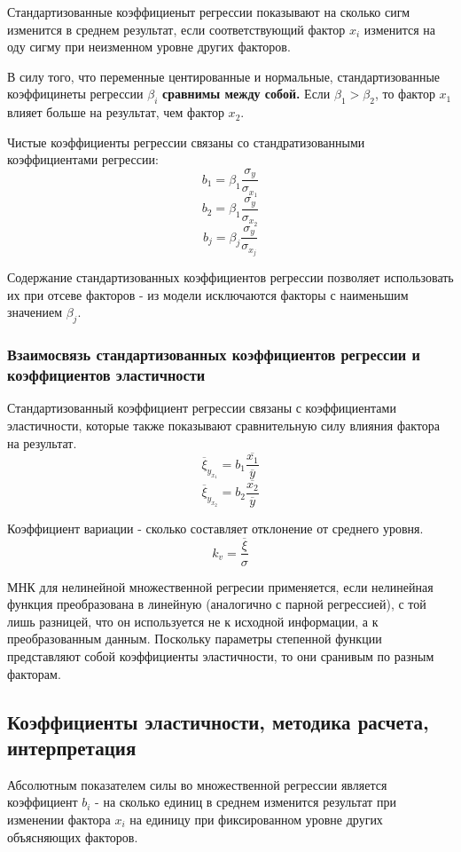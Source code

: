 \documentclass[aps,%
12pt,%
final,%
oneside,
onecolumn,%
musixtex, %
superscriptaddress,%
centertags]{article} %
\theoremstyle{plain}
\theoremstyle{definition}
\theoremstyle{remark}
\begin{document}
Стандартизованные коэффициеныт регрессии показывают на сколько сигм изменится в среднем результат, если соответствующий фактор $x_i$ изменится на оду сигму при неизменном уровне других факторов. 

В силу того, что переменные центированные и нормальные, стандартизованные коэффицинеты регрессии $\beta_i$ \textbf{сравнимы между собой.} Если $\beta_1 > \beta_2$, то фактор $x_1$ влияет больше на результат, чем фактор $x_2$.

Чистые коэффициенты регрессии связаны со стандратизованными коэффициентами регрессии:
$$ b_1 = \beta_1 \frac{\sigma_y}{\sigma_{x_1}}$$
$$ b_2 = \beta_1 \frac{\sigma_y}{\sigma_{x_2}}$$
$$ b_j = \beta_j \frac{\sigma_y}{\sigma_{x_j}}$$

Содержание стандартизованных коэффициентов регрессии позволяет использовать их при отсеве факторов - из модели исключаются факторы с наименьшим значением $\beta_j$.

\subsubsection{Взаимосвязь стандартизованных коэффициентов регрессии и коэффициентов эластичности}

Стандартизованный коэффициент регрессии связаны с коэффициентами эластичности, которые также показывают сравнительную силу влияния фактора на результат.
$$ \overline{\xi}_{y_{x_1}} = b_1 \frac{\overline{x_1}}{\overline{y}}$$
$$ \overline{\xi}_{y_{x_2}} = b_2 \frac{\overline{x_2}}{\overline{y}} $$

Коэффициент вариации - сколько составляет отклонение от среднего уровня.
$$ k_v = \frac{\overline{\xi}}{\sigma} $$

МНК для нелинейной множественной регресии применяется, если нелинейная функция преобразована в линейную (аналогично с парной регрессией), с той лишь разницей, что он используется не к исходной информации, а к преобразованным данным. Поскольку параметры степенной функции представляют собой коэффициенты эластичности, то они сранивым по разным факторам.

\newpage
\subsection{Коэффициенты эластичности, методика расчета, интерпретация}

Абсолютным показателем силы во множественной регрессии является коэффициент $b_i$ - на сколько единиц в среднем изменится результат при изменении фактора $x_i$ на единицу при фиксированном уровне других объясняющих факторов.
\end{document}

